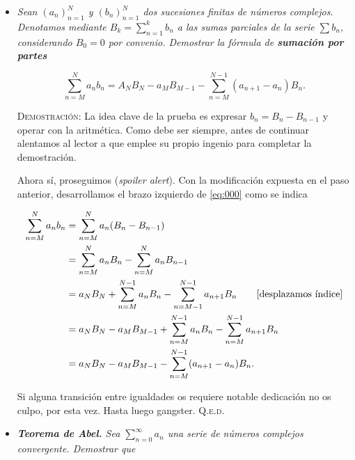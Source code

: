 \documentclass{article}
\begin{document}
\begin{itemize}
    \item \textit{Sean $(a_n)_{n=1}^N$ y $(b_n)_{n=1}^N$ dos sucesiones finitas de números complejos. Denotamos mediante $B_k = \sum_{n=1}^{k} b_n$ a las sumas parciales de la serie $\sum b_n$, considerando $B_0 = 0$ por convenio. Demostrar la fórmula de \textbf{sumación por partes}}
    
    \begin{equation}
        \sum_{n=M}^{N} a_nb_n = A_NB_N - a_MB_{M-1} - \sum_{n=M}^{N-1}(a_{n + 1} - a_n)B_n.
        \label{eq:000}
    \end{equation}

    \vspace{7px}

    \textsc{Demostración}: La idea clave de la prueba es expresar $b_n = B_n - B_{n - 1}$ y operar con la aritmética. Como debe ser siempre, antes de continuar alentamos al lector a que emplee su propio ingenio para completar la demostración.

    Ahora sí, proseguimos (\textit{spoiler alert}). Con la modificación expuesta en el paso anterior, desarrollamos el brazo izquierdo de \eqref{eq:000} como se indica

    \begin{equation*}
        \begin{split}
            \sum_{n=M}^{N} a_nb_n &= \sum_{n=M}^{N} a_n(B_n - B_{n - 1}) \\
            &= \sum_{n=M}^{N} a_nB_n - \sum_{n=M}^{N} a_nB_{n-1} \\
            &= a_NB_N + \sum_{n=M}^{N-1} a_nB_n - \sum_{n=M-1}^{N-1} a_{n+1}B_n \hspace{20px} \text{[desplazamos índice]} \\
            &= a_NB_N - a_MB_{M-1} + \sum_{n=M}^{N-1} a_nB_n - \sum_{n=M}^{N-1} a_{n+1}B_n \\
            &= a_NB_N - a_MB_{M-1} - \sum_{n=M}^{N-1} (a_{n+1} - a_n)B_n.
        \end{split}
    \end{equation*}

    Si alguna transición entre igualdades os requiere notable dedicación no os culpo, por esta vez. Hasta luego gangster. \hfill{\textsc{Q.e.d.}}

    \vspace{12px}

    \item \textit{\textbf{Teorema de Abel.} Sea $\sum_{n=0}^{\infty} a_n$ una serie de números complejos convergente. Demostrar que}
    

\end{itemize}
\end{document}
